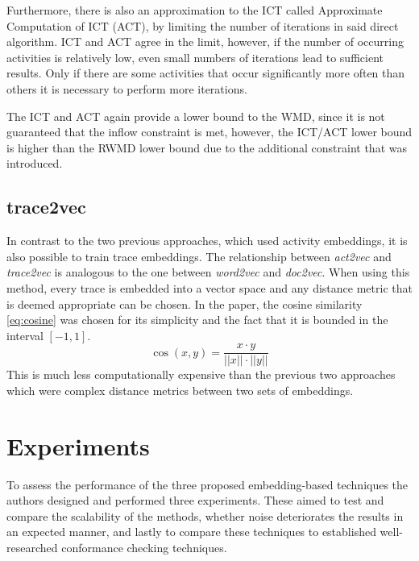 \documentclass[runningheads]{template/llncs}
\begin{document}
Furthermore, there is also an approximation to the ICT called Approximate Computation of ICT (ACT), by limiting the number of iterations in said direct algorithm.
ICT and ACT agree in the limit, however, if the number of occurring activities is relatively low, even small numbers of iterations lead to sufficient results.
Only if there are some activities that occur significantly more often than others it is necessary to perform more iterations.

The ICT and ACT again provide a lower bound to the WMD, since it is not guaranteed that the inflow constraint is met, however, the ICT/ACT lower bound is higher than the RWMD lower bound due to the additional constraint that was introduced.

\subsection{trace2vec}
In contrast to the two previous approaches, which used activity embeddings, it is also possible to train trace embeddings.
The relationship between \emph{act2vec} and \emph{trace2vec} is analogous to the one between \emph{word2vec} and \emph{doc2vec}.
When using this method, every trace is embedded into a vector space and any distance metric that is deemed appropriate can be chosen.
In the paper, the cosine similarity \cref{eq:cosine} was chosen for its simplicity and the fact that it is bounded in the interval $[-1,1]$.
\begin{equation}
	\cos(x,  y) = \frac { x \cdot  y}{|| x|| \cdot || y||}
	\label{eq:cosine}
\end{equation}
This is much less computationally expensive than the previous two approaches which were complex distance metrics between two sets of embeddings.

\section{Experiments}
\label{sec:results}
To assess the performance of the three proposed embedding-based techniques the authors designed and performed three experiments.
These aimed to test and compare the scalability of the methods, whether noise deteriorates the results in an expected manner, and lastly to compare these techniques to established well-researched conformance checking techniques.
\end{document}
